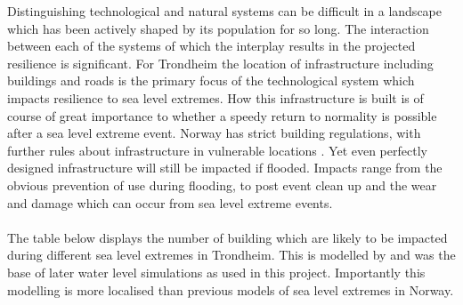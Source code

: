 Distinguishing technological and natural systems can be difficult in a landscape which has been actively shaped by its population for so long. The interaction between each of the systems of which the interplay results in the projected resilience is significant. For Trondheim the location of infrastructure including buildings and roads is the primary focus of the technological system which impacts resilience to sea level extremes. How this infrastructure is built is of course of great importance to whether a speedy return to normality is possible after a sea level extreme event. Norway has strict building regulations, with further rules about infrastructure in vulnerable locations \cite{direktoratet_for_byggkvalitet_direktoratet_nodate}. Yet even perfectly designed infrastructure will still be impacted if flooded. Impacts range from the obvious  prevention of use during flooding, to post event clean up and the wear and damage which can occur from sea level extreme events.
\paragraph{}
The table below displays the number of building which are likely to be impacted during different sea level extremes in Trondheim. This is modelled by \cite{kartverket_se_2021} and was the base of later water level simulations as used in this project. Importantly this modelling is more localised than previous models of sea level extremes in Norway.

